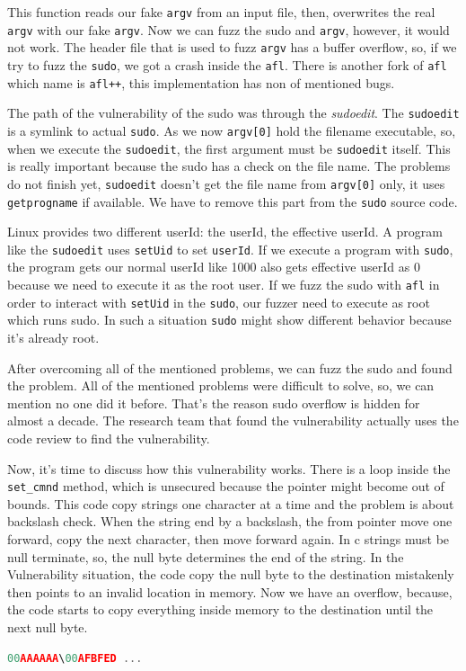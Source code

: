 \documentclass{masterthesis}
\begin{document}
This function reads our fake \lstinline{argv} from an input file, then, overwrites the real \lstinline{argv} with our fake \lstinline{argv}. Now we can fuzz the sudo and \lstinline{argv}, however, it would not work. The header file that is used to fuzz \lstinline{argv} has a buffer overflow, so, if we try to fuzz the \lstinline{sudo}, we got a crash inside the \lstinline{afl}. There is another fork of \lstinline{afl} which name is \lstinline{afl++}, this implementation has non of mentioned bugs.

The path of the vulnerability of the sudo was through the \emph{sudoedit}. The \lstinline{sudoedit} is a symlink to actual \lstinline{sudo}. As we now \lstinline{argv[0]} hold the filename executable, so, when we execute the \lstinline{sudoedit}, the first argument must be \lstinline{sudoedit} itself. This is really important because the sudo has a check on the file name. The problems do not finish yet, \lstinline{sudoedit} doesn't get the file name from \lstinline{argv[0]} only, it uses \lstinline{getprogname} if available. We have to remove this part from the \lstinline{sudo} source code.

Linux provides two different userId: the userId, the effective userId. A program like the \lstinline{sudoedit} uses \lstinline{setUid} to set \lstinline{userId}. If we execute a program with \lstinline{sudo}, the program gets our normal userId like 1000 also gets effective userId as 0 because we need to execute it as the root user. If we fuzz the sudo with \lstinline{afl} in order to interact with \lstinline{setUid} in the \lstinline{sudo}, our fuzzer need to execute as root which runs sudo. In such a situation \lstinline{sudo} might show different behavior because it's already root.

After overcoming all of the mentioned problems, we can fuzz the sudo and found the problem. All of the mentioned problems were difficult to solve, so, we can mention no one did it before. That's the reason sudo overflow is hidden for almost a decade. The research team that found the vulnerability actually uses the code review to find the vulnerability.

Now, it's time to discuss how this vulnerability works. There is a loop inside the \lstinline{set_cmnd} method, which is unsecured because the pointer might become out of bounds. This code copy strings one character at a time and the problem is about backslash check. When the string end by a backslash, the from pointer move one forward, copy the next character, then move forward again. In c strings must be null terminate, so, the null byte determines the end of the string. In the Vulnerability situation, the code copy the null byte to the destination mistakenly then points to an invalid location in memory. Now we have an overflow, because, the code starts to copy everything inside memory to the destination until the next null byte.
\begin{lstlisting}[language=c,frame=tlrb]
00AAAAAA\00AFBFED ...
\end{lstlisting}
\end{document}
